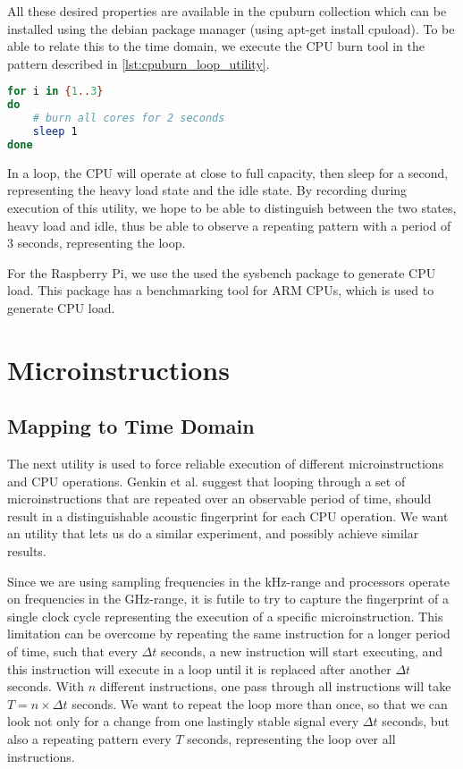 All these desired properties are available in the cpuburn collection which can be installed using the debian package manager (using
apt-get install cpuload). 
To be able to relate this to the time domain, we execute the CPU burn tool in the pattern described in \autoref{lst:cpuburn_loop_utility}.

\begin{lstlisting}[language=BASH, caption={Mapping execution to the time domain: CPU Burn Utility}, label={lst:cpuburn_loop_utility}]
for i in {1..3}
do
	# burn all cores for 2 seconds
	sleep 1
done
\end{lstlisting}

In a loop, the CPU will operate at close to full capacity, then sleep for a second, representing the heavy load state and the idle state.
By recording during execution of this utility, we hope to be able to distinguish between the two states, heavy load and idle, thus be able to observe a repeating pattern with a period of \(3\) seconds, representing the loop.

For the Raspberry Pi, we use the used the sysbench\cite{url:sysbench_wiki} package to generate CPU load. 
This package has a benchmarking tool for ARM CPUs, which is used to generate CPU load. 


\section{Microinstructions}\label{chp4:sec:microinstructions}


\subsection{Mapping to Time Domain}\label{chp4:sec:mapping_to_time_domain}
The next utility is used to force reliable execution of different microinstructions and CPU operations.
Genkin et al. suggest that looping through a set of microinstructions that are repeated over an observable period of time, should result in a distinguishable acoustic fingerprint for each CPU operation.
We want an utility that lets us do a similar experiment, and possibly achieve similar results.

Since we are using sampling frequencies in the kHz-range and processors operate on frequencies in the GHz-range, it is futile to try to capture the fingerprint of a single clock cycle representing the execution of a specific microinstruction. 
This limitation can be overcome by repeating the same instruction for a longer period of time, such that every \(\Delta t\) seconds, a new instruction will start executing, and this instruction will execute in a loop until it is replaced after another \(\Delta t\) seconds.
With \(n\) different instructions, one pass through all instructions will take \(T = n \times \Delta t\) seconds.
We want to repeat the loop more than once, so that we can look not only for a change from one lastingly stable signal every \(\Delta t\) seconds, but also a repeating pattern every \(T\) seconds, representing the loop over all instructions.


